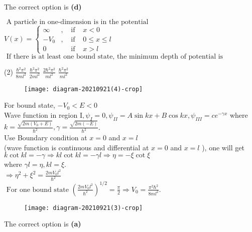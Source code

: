 \begin{enumerate}
\begin{answer}
	The correct option is \textbf{(d)}	
\end{answer}
\begin{minipage}{\textwidth}
	\item $\text { A particle in one-dimension is in the potential }$
	$V(x)=\left\{\begin{array}{llll}
	\infty & , & \text { if } & x<0 \\
	-V_{0} & , & \text { if } & 0 \leq x \leq l \\
	0 & & \text { if } & x>l
	\end{array}\right.$
	$\text { If there is at least one bound state, the minimum depth of potential is }$
\end{minipage}
\begin{tasks}(2)
	\task[\textbf{A.}] $\frac{\hbar^{2} \pi^{2}}{8 m l^{2}}$
	\task[\textbf{B.}]$\frac{\hbar^{2} \pi^{2}}{2 m l^{2}}$
	\task[\textbf{C.}]$\frac{2 \hbar^{2} \pi^{2}}{m l^{2}}$
	\task[\textbf{D.}]$\frac{\hbar^{2} \pi^{2}}{m l^{2}}$
\end{tasks}
\begin{answer}
	\begin{figure}[H]
		\centering
		\texttt{[image: diagram-20210921(4)-crop]}
		\caption{}
		\label{}
	\end{figure}
	For bound state, $-V_{0}<E<0$\\
	Wave function in region $\mathrm{I}, \psi_{I}=0, \psi_{I I}=A \sin k x+B \cos k x, \psi_{I I I}=c e^{-\gamma x}$ where $k=\frac{\sqrt{2 m\left(V_{0}+E\right)}}{\hbar^{2}}, \gamma=\frac{\sqrt{2 m(-E)}}{\hbar^{2}}$.\\
	Use Boundary condition at $x=0$ and $x=l$\\
	(wave function is continuous and differential at $x=0$ and $x=l$ ), one will get $k \cot k l=-\gamma \Rightarrow k l \cot k l=-\gamma l \Rightarrow \eta=-\xi \cot \xi$\\
	where $\gamma l=\eta, k l=\xi$.\\
	$\Rightarrow \eta^{2}+\xi^{2}=\frac{2 m V_{0} l^{2}}{\hbar^{2}}$\\
	$\text { For one bound state }\left(\frac{2 m V_{0} l^{2}}{\hbar^{2}}\right)^{1 / 2}=\frac{\pi}{2} \Rightarrow V_{0}=\frac{\pi^{2} \hbar^{2}}{8 m l^{2}} \text {. }$\\
	\begin{figure}[H]
		\centering
		\texttt{[image: diagram-20210921(3)-crop]}
		\caption{}
		\label{}
	\end{figure}
	The correct option is \textbf{(a)}	

\end{answer}
\end{enumerate}
